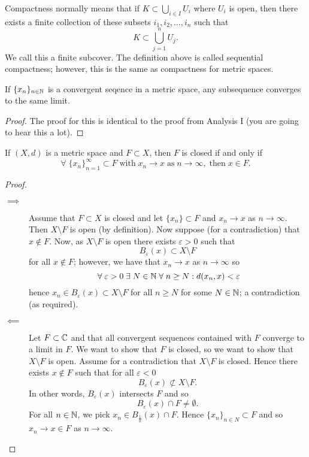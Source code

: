 \begin{remark}
    Compactness normally means that if $K \subset \bigcup_{i \in I} U_i$ where $U_i$ is open, then there exists a finite collection of these subsets $i_1, i_2, \ldots, i_n$ such that
    \[ K \subset \bigcup_{j = 1}^n U_j. \]
    We call this a finite subcover. The definition above is called sequential compactness; however, this is the same as compactness for metric spaces.
\end{remark}

\begin{lemma}[]
    If $\{x_n\}_{n \in \mathbb{N}}$ is a convergent seqence in a metric space, any subsequence converges to the same limit.
\end{lemma}

\begin{proof}
    The proof for this is identical to the proof from Analysis I (you are going to hear this a lot).
\end{proof}

\begin{proposition}
    If $(X, d)$ is a metric space and $F \subset X$, then $F$ is closed if and only if
    \[ \forall\; \{x_n\}_{n = 1}^\infty \subset F \;\text{with}\; x_n \to x \;\text{as}\; n \to \infty, \;\text{then}\; x \in F. \]
\end{proposition}

\begin{proof}
    \begin{description}
        \item[$\implies$] Assume that $F \subset X$ is closed and let $\{x_n\} \subset F$ and $x_n \to x$ as $n \to \infty$. Then $X \setminus F$ is open (by definition). Now suppose (for a contradiction) that $x \not \in F$. Now, as $X \setminus F$ is open there exists $\varepsilon > 0$ such that
            \[ B_\varepsilon(x) \subset X \setminus F \]
            for all $x \not \in F$; however, we have that $x_n \to x$ as $n \to \infty$ so 
            \[ \;\forall\; \varepsilon > 0 \;\exists\; N \in \mathbb{N} \;\forall\; n \geq N: d(x_n, x) < \varepsilon \]
            hence $x_n \in B_\varepsilon(x) \subset X \setminus F$ for all $n \geq N$ for some $N \in \mathbb{N}$; a contradiction (as required).

        \item[$\impliedby$] Let $F \subset \mathbb{C}$ and that all convergent sequences contained with $F$ converge to a limit in $F$. We want to show that $F$ is closed, so we want to show that $X \setminus F$ is open. Assume for a contradiction that $X \setminus F$ is closed. Hence there exists $x \not \in F$ such that for all $\varepsilon < 0$
            \[ B_\varepsilon(x) \not \subset X \setminus F. \]
            In other words, $B_\varepsilon(x)$ intersects $F$ and so
            \[ B_\varepsilon(x) \cap F \neq \emptyset. \]
            For all $n \in \mathbb{N}$, we pick $x_n \in B_{\frac 1n}(x) \cap F$. Hence $\{x_n\}_{n \in N} \subset F$ and so $x_n \to x \in F$ as $n \to \infty$.
    \end{description}
\end{proof}

